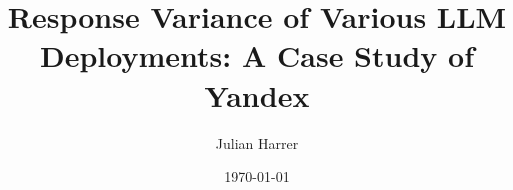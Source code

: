 \documentclass[
    numbers=noenddot,
    parskip=half-,
    fontsize=12pt,
    paper=a4,
    oneside,
    titlepage,
    bibliography=totoc,
    chapterprefix=false,
]{scrbook}
\title{Response Variance of Various LLM Deployments: A Case Study of Yandex}
\author{Julian Harrer}
\date{\today}
\begin{document}
\frontmatter
%


\tableofcontents
\newpage


\newpage


\newpage

\thispagestyle{empty}
\cleardoublepage
\listoffigures
\newpage

\thispagestyle{empty}
\cleardoublepage
\listoftables
\newpage

\mainmatter








\begin{appendices}
	
\end{appendices}
\newpage


\backmatter

\printbibliography


\end{document}
